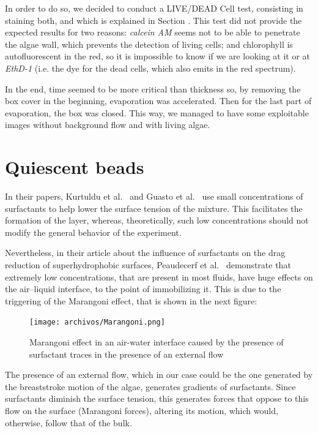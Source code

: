 In order to do so, we decided to conduct a LIVE/DEAD Cell test, consisting in staining both, and which is explained in Section \label{mm_staining}. This test did not provide the expected results for two reasons: \textit{calcein AM} seems not to be able to penetrate the algae wall, which prevents the detection of living cells; and chlorophyll is autofluorescent in the red, so it is impossible to know if we are looking at it or at \textit{EthD-1} (i.e. the dye for the dead cells, which also emits in the red spectrum).

In the end, time seemed to be more critical than thickness so, by removing the box cover in the beginning, evaporation was accelerated. Then for the last part of evaporation, the box was closed. This way, we managed to have some exploitable images without background flow and with living algae.

\section{Quiescent beads}
 
In their papers, Kurtuldu et al.~\cite{Kurtuldu2011} and Guasto et al.~\cite{Guasto} use small concentrations of surfactants to help lower the surface tension of the mixture. This facilitates the formation of the layer, whereas, theoretically, such low concentrations should not modify the general behavior of the experiment.

Nevertheless, in their article about the influence of surfactants on the drag
reduction of superhydrophobic surfaces, Peaudecerf et al.~\cite{Peaudecerf} demonstrate that extremely low concentrations, that are present in most fluids, have huge effects on the air–liquid interface, to the point of immobilizing it. This is due to the triggering of the Marangoni effect, that is shown in the next figure:

\begin{figure}[H]
	\centering
	\texttt{[image: archivos/Marangoni.png]}
	\caption[Caption]{Marangoni effect in an air-water interface caused by the presence of surfactant traces in the presence of an external flow~\cite{Peaudecerf}\protect\footnotemark}
	\label{Marangoni}
\end{figure}


The presence of an external flow, which in our case could be the one generated by the breaststroke motion of the algae, generates gradients of surfactants. Since surfactants diminish the surface tension, this generates forces that oppose to this flow on the surface (Marangoni forces), altering its motion, which would, otherwise, follow that of the bulk.

